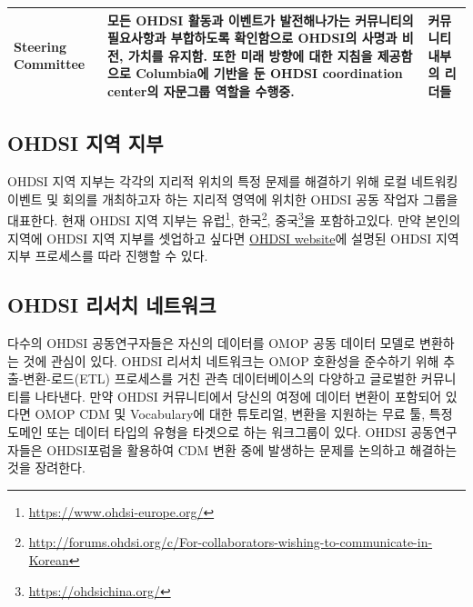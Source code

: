 \documentclass[11pt]{book}
\let\rmarkdownfootnote\footnote%
\def\footnote{\protect\rmarkdownfootnote}
\theoremstyle{definition}
\theoremstyle{definition}
\theoremstyle{definition}
\theoremstyle{remark}
\begin{document}
\begin{longtable}[]{@{}lll@{}}
\begin{minipage}[t]{0.11\columnwidth}\raggedright\strut
Steering Committee\strut
\end{minipage} & \begin{minipage}[t]{0.30\columnwidth}\raggedright\strut
모든 OHDSI 활동과 이벤트가 발전해나가는 커뮤니티의 필요사항과 부합하도록
확인함으로 OHDSI의 사명과 비전, 가치를 유지함. 또한 미래 방향에 대한
지침을 제공함으로 Columbia에 기반을 둔 OHDSI coordination center의
자문그룹 역할을 수행중.\strut
\end{minipage} & \begin{minipage}[t]{0.15\columnwidth}\raggedright\strut
커뮤니티 내부의 리더들\strut
\end{minipage}\tabularnewline
\bottomrule
\end{longtable}

\subsection{OHDSI 지역 지부}\label{ohdsi--}

OHDSI 지역 지부는 각각의 지리적 위치의 특정 문제를 해결하기 위해 로컬
네트워킹 이벤트 및 회의를 개최하고자 하는 지리적 영역에 위치한 OHDSI
공동 작업자 그룹을 대표한다. 현재 OHDSI 지역 지부는 유럽\footnote{\url{https://www.ohdsi-europe.org/}},
한국\footnote{\url{http://forums.ohdsi.org/c/For-collaborators-wishing-to-communicate-in-Korean}},
중국\footnote{\url{https://ohdsichina.org/}}을 포함하고있다. 만약 본인의
지역에 OHDSI 지역 지부를 셋업하고 싶다면
\href{https://www.ohdsi.org/who-we-are/regional-chapters}{OHDSI
website}에 설명된 OHDSI 지역 지부 프로세스를 따라 진행할 수 있다.

\subsection{OHDSI 리서치 네트워크}\label{ohdsi--}

다수의 OHDSI 공동연구자들은 자신의 데이터를 OMOP 공동 데이터 모델로
변환하는 것에 관심이 있다. OHDSI 리서치 네트워크는 OMOP 호환성을
준수하기 위해 추출-변환-로드(ETL) 프로세스를 거친 관측 데이터베이스의
다양하고 글로벌한 커뮤니티를 나타낸다. 만약 OHDSI 커뮤니티에서 당신의
여정에 데이터 변환이 포함되어 있다면 OMOP CDM 및 Vocabulary에 대한
튜토리얼, 변환을 지원하는 무료 툴, 특정 도메인 또는 데이터 타입의 유형을
타겟으로 하는 워크그룹이 있다. OHDSI 공동연구자들은 OHDSI포럼을 활용하여
CDM 변환 중에 발생하는 문제를 논의하고 해결하는 것을 장려한다.
\end{document}
